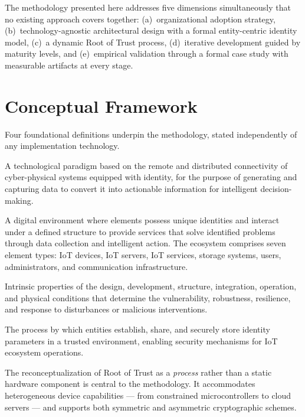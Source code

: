 \documentclass[12pt,a4paper]{article}
\begin{document}
The methodology presented here addresses five dimensions simultaneously that no existing approach covers together: (a)~organizational adoption strategy, (b)~technology-agnostic architectural design with a formal entity-centric identity model, (c)~a dynamic Root of Trust process, (d)~iterative development guided by maturity levels, and (e)~empirical validation through a formal case study with measurable artifacts at every stage.

\section{Conceptual Framework}
\label{sec:framework}

Four foundational definitions underpin the methodology, stated independently of any implementation technology.

\begin{description}[leftmargin=0pt, style=nextline]
  \item[\textbf{IoT}] A technological paradigm based on the remote and distributed connectivity of cyber-physical systems equipped with identity, for the purpose of generating and capturing data to convert it into actionable information for intelligent decision-making.

  \item[\textbf{IoT Ecosystem}] A digital environment where elements possess unique identities and interact under a defined structure to provide services that solve identified problems through data collection and intelligent action. The ecosystem comprises seven element types: IoT devices, IoT servers, IoT services, storage systems, users, administrators, and communication infrastructure.

  \item[\textbf{Cybersecurity in an IoT Ecosystem}] Intrinsic properties of the design, development, structure, integration, operation, and physical conditions that determine the vulnerability, robustness, resilience, and response to disturbances or malicious interventions.

  \item[\textbf{Root of Trust Process}] The process by which entities establish, share, and securely store identity parameters in a trusted environment, enabling security mechanisms for IoT ecosystem operations.
\end{description}

The reconceptualization of Root of Trust as a \emph{process} rather than a static hardware component is central to the methodology. It accommodates heterogeneous device capabilities --- from constrained microcontrollers to cloud servers --- and supports both symmetric and asymmetric cryptographic schemes.
\end{document}
